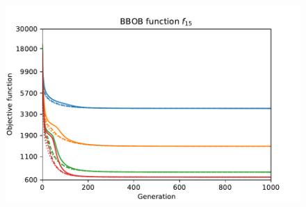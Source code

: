\begin{figure}[ht!]
\begin{minipage}[t]{0.32\textwidth}
    \end{minipage}
    \hfill
    \begin{minipage}[t]{0.32\textwidth}
        \centering
        \includegraphics[width=\textwidth]{img/runs/fitness_pso2006_f15.pdf}
    \end{minipage}


\end{figure}
